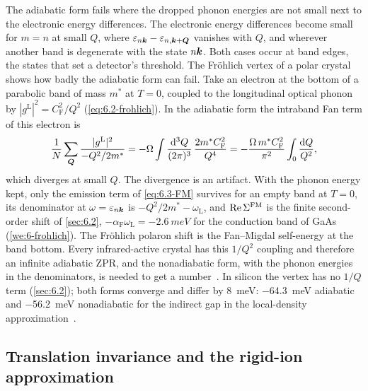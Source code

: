 The adiabatic form fails where the dropped phonon energies are not small next to the electronic energy differences. The electronic energy differences become small for $m = n$ at small $Q$, where $\varepsilon_{n\bm{k}} - \varepsilon_{n,\bm{k}+\bm{Q}}$ vanishes with $Q$, and wherever another band is degenerate with the state $n\bm{k}$. Both cases occur at band edges, the states that set a detector's threshold. The Fr\"ohlich vertex of a polar crystal shows how badly the adiabatic form can fail. Take an electron at the bottom of a parabolic band of mass $m^*$ at $T = 0$, coupled to the longitudinal optical phonon by $|g^{\mathrm{L}}|^2 = C_{\mathrm{F}}^2/Q^2$ (\cref{eq:6.2-frohlich}). In the adiabatic form the intraband Fan term of this electron is
\begin{equation*}
  \frac1N\sum_{\bm{Q}}\frac{|g^{\mathrm{L}}|^2}{-Q^2/2m^*} = -\Omega\int\frac{\mathrm{d}^3Q}{(2\pi)^3}\,\frac{2m^*C_{\mathrm{F}}^2}{Q^4} = -\frac{\Omega\,m^*C_{\mathrm{F}}^2}{\pi^2}\int_0\frac{\mathrm{d} Q}{Q^2} ,
\end{equation*}
which diverges at small $Q$. The divergence is an artifact. With the phonon energy kept, only the emission term of \cref{eq:6.3-FM} survives for an empty band at $T = 0$, its denominator at $\omega = \varepsilon_{n\bm{k}}$ is $-Q^2/2m^* - \omega_{\mathrm{L}}$, and $\operatorname{Re}\Sigma^{\mathrm{FM}}$ is the finite second-order shift of \cref{sec:6.2}, $-\alpha_{\mathrm{F}}\omega_{\mathrm{L}} = -\SI{2.6}{meV}$ for the conduction band of GaAs (\cref{we:6-frohlich}). The Fr\"ohlich polaron shift is the Fan--Migdal self-energy at the band bottom. Every infrared-active crystal has this $1/Q^2$ coupling and therefore an infinite adiabatic ZPR, and the nonadiabatic form, with the phonon energies in the denominators, is needed to get a number~\cite{ponce2015temperature}. In silicon the vertex has no $1/Q$ term (\cref{sec:6.2}); both forms converge and differ by \SI{8}{meV}: \SI{-64.3}{meV} adiabatic and \SI{-56.2}{meV} nonadiabatic for the indirect gap in the local-density approximation~\cite[Table~VI]{ponce2015temperature}.

\subsection{Translation invariance and the rigid-ion approximation}


